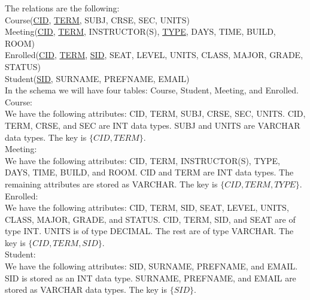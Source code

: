 
The relations are the following: \\

Course(\underline{CID}, \underline{TERM}, SUBJ, CRSE, SEC, UNITS) \\
Meeting(\underline{CID}, \underline{TERM}, INSTRUCTOR(S), \underline{TYPE}, DAYS, TIME, BUILD, ROOM) \\
Enrolled(\underline{CID}, \underline{TERM}, \underline{SID}, SEAT, LEVEL, UNITS, CLASS, MAJOR, GRADE, STATUS) \\
Student(\underline{SID}, SURNAME, PREFNAME, EMAIL) \\

In the schema we will have four tables: Course, Student, Meeting, and Enrolled. \\

Course: \\
We have the following attributes: CID, TERM, SUBJ, CRSE, SEC, UNITS. CID, TERM, CRSE, and SEC are INT data types. SUBJ and UNITS are VARCHAR data types. The key is $\{CID, TERM\}$. \\

Meeting:\\
We have the following attributes: CID, TERM, INSTRUCTOR(S), TYPE, DAYS, TIME, BUILD, and ROOM. CID and TERM are INT data types. The remaining attributes are stored as VARCHAR. The key is $\{CID, TERM, TYPE\}$. \\

Enrolled: \\
We have the following attributes: CID, TERM, SID, SEAT, LEVEL, UNITS, CLASS, MAJOR, GRADE, and STATUS. CID, TERM, SID, and SEAT are of type INT. UNITS is of type DECIMAL. The rest are of type VARCHAR. The key is $\{CID, TERM, SID\}$. \\

Student: \\
We have the following attributes: SID, SURNAME, PREFNAME, and EMAIL. SID is stored as an INT data type. SURNAME, PREFNAME, and EMAIL are stored as VARCHAR data types. The key is $\{SID\}$. \\